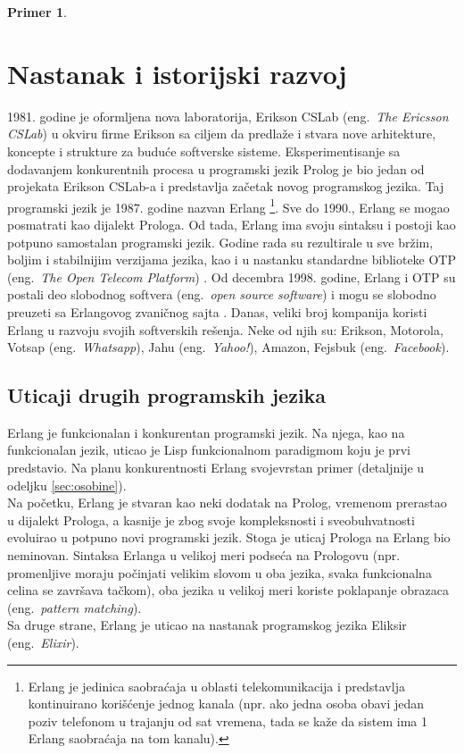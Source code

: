 \documentclass[a4paper]{article}
\newtheorem{primer}{Primer}[section]
\begin{document}
{\begin{primer}
\end{primer}

\section{Nastanak i istorijski razvoj}
\label{sec:nastanak}

1981. godine je oformljena nova laboratorija, Erikson CSLab (eng.~{\em The Ericsson CSLab}) u okviru firme Erikson sa
ciljem da predlaže i stvara nove arhitekture, koncepte i strukture za buduće softverske sisteme.
Eksperimentisanje sa dodavanjem konkurentnih procesa u programski jezik Prolog je bio jedan
od projekata Erikson CSLab-a i predstavlja začetak novog programskog jezika.
Taj programski jezik je 1987. godine nazvan Erlang
\footnote{Erlang je jedinica saobraćaja u oblasti telekomunikacija 
i predstavlja kontinuirano korišćenje jednog kanala 
(npr. ako jedna osoba obavi jedan poziv telefonom u trajanju od sat vremena, 
tada se kaže da sistem ima 1 Erlang saobraćaja na tom kanalu).}.    
Sve do 1990., Erlang se mogao posmatrati kao dijalekt Prologa. Od tada, Erlang
ima svoju sintaksu i postoji kao potpuno samostalan programski jezik.
Godine rada su rezultirale u sve bržim, boljim i stabilnijim verzijama jezika, kao
i u nastanku standardne biblioteke OTP (eng.~{\em The Open Telecom Platform}) \cite{phdthesis}.
Od decembra 1998. godine, Erlang i OTP su postali deo slobodnog softvera (eng.~{\em open source software})
i mogu se slobodno preuzeti sa Erlangovog zvaničnog sajta \cite{sajt}.
Danas, veliki broj kompanija koristi Erlang u razvoju
svojih softverskih rešenja. Neke od njih su: Erikson, Motorola, Votsap (eng.~{\em Whatsapp}), 
Jahu (eng.~{\em Yahoo!}), Amazon, Fejsbuk (eng.~{\em Facebook}).


\subsection{Uticaji drugih programskih jezika}
\label{subsec:uticaji}

Erlang je funkcionalan i konkurentan programski jezik.
Na njega, kao na funkcionalan jezik, uticao je Lisp funkcionalnom paradigmom koju je 
prvi predstavio. Na planu konkurentnosti Erlang svojevrstan primer (detaljnije u odeljku \ref{sec:osobine}). \\
Na početku, Erlang je stvaran kao neki dodatak na Prolog, vremenom prerastao u 
dijalekt Prologa, a kasnije je zbog svoje kompleksnosti i sveobuhvatnosti evoluirao
u potpuno novi programski jezik. Stoga je uticaj Prologa na Erlang bio 
neminovan. Sintaksa Erlanga u velikoj meri podseća na Prologovu 
(npr. promenljive moraju počinjati velikim slovom u oba jezika, 
svaka funkcionalna celina se završava tačkom), oba jezika u velikoj meri koriste poklapanje obrazaca
(eng.~{\em pattern matching}). \\
Sa druge strane, Erlang je uticao na nastanak programskog jezika Eliksir (eng.~{\em Elixir}).

}
\end{document}
